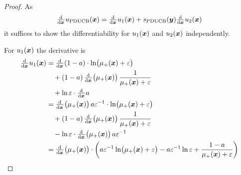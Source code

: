 \newcommand{\dx}{\od{}{\vc{x}}}
\begin{proof}
    As
    \begin{equation*}
        \dx u\ped{PDUCB}(\vc x) = \dx u_1(\vc x) + s\ped{PDUCB}(\vc y) \dx 
        u_2(\vc x)
    \end{equation*}
    it suffices to show the differentiability for $u_1(\bm{x})$ and $u_2(\bm{x})$ 
    independently.

    For $u_1(\bm{x})$ the derivative is
    \begin{align*}
        \dx u_1(\vc x) &= \dx\!\del{1 - a} \cdot \ln\!\del{\mu_+(\vc x) 
            + \varepsilon} \\
        &\quad + \del{1 - a} \dx\!\del{\mu_+(\vc x)} \frac{1}{\mu_+(\vc x) 
            + \varepsilon} \\
        &\quad + \ln \varepsilon \cdot \dx a \\
        &= \dx\!\del{\mu_+(\vc x)} a\varepsilon^{-1} \cdot \ln\!\del{\mu_+(\vc 
            x) + \varepsilon} \\
        &\quad + \del{1 - a} \dx\!\del{\mu_+(\vc x)} \frac{1}{\mu_+(\vc x) 
            + \varepsilon} \\
        &\quad - \ln \varepsilon \cdot \dx\!\del{\mu_+(\vc x)} a\varepsilon^{-1}
        \\
        &= \dx\!\del{\mu_+(\vc x)} \cdot \del{a\varepsilon^{-1} 
            \ln\!\del{\mu_+(\vc x) + \varepsilon} - a\varepsilon^{-1} \ln 
            \varepsilon + \frac{1 - a}{\mu_+(\vc{x}) + \varepsilon}} \\

\end{align*}
\end{proof}
